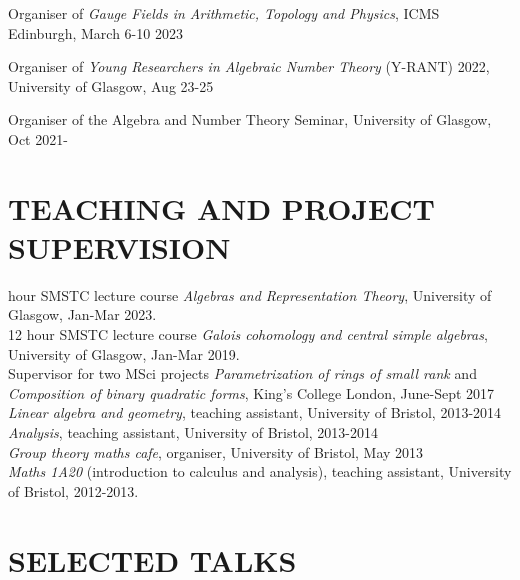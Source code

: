 \documentclass{res}
\begin{document}
\begin{resume}
 \medskip
 
 \textup{Organiser of \textit{Gauge Fields in Arithmetic, Topology and Physics}},   \textup{ICMS Edinburgh, March 6-10 2023}  
 
\textup{Organiser of \textit{Young Researchers in Algebraic Number Theory} (Y-RANT) 2022},   \textup{University of Glasgow, Aug 23-25}  
 
\textup{Organiser of the  Algebra and Number Theory Seminar, }   \textup{University of Glasgow, Oct 2021-}\medskip\\


\section{TEACHING AND PROJECT SUPERVISION}       

 hour SMSTC lecture course {\it Algebras and Representation Theory}, University of Glasgow, Jan-Mar 2023.\medskip\\
12 hour SMSTC lecture course {\it Galois cohomology and central simple algebras}, University of Glasgow, Jan-Mar 2019.\medskip\\
Supervisor for two MSci projects {\it Parametrization of rings of small rank} 
\textup{and} {\it Composition of binary quadratic forms}\textup{, King's College London, June-Sept 2017} \medskip\\   
    {\it Linear algebra and geometry}, teaching assistant, University of Bristol, 2013-2014 \medskip\\         
    {\it Analysis}, teaching assistant, University of Bristol, 2013-2014 \medskip \\
{\it Group theory maths cafe}, organiser, University of Bristol, May 2013 \medskip \\
    {\it Maths 1A20} (introduction to calculus and analysis), teaching assistant, University of Bristol, 2012-2013. 
 

\section{SELECTED TALKS}         
        

\end{resume}
\end{document}
